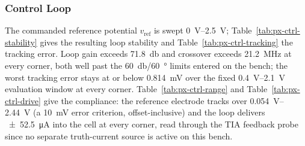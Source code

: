%

\subsubsection{Control Loop}\label{sss:pixel-ctrl}

The commanded reference potential $v_{\mathrm{ref}}$ is swept
\SIrange{0}{2.5}{\volt}; Table~\ref{tab:px-ctrl-stability} gives the resulting
loop stability and Table~\ref{tab:px-ctrl-tracking} the tracking error. Loop
gain exceeds \SI{71.8}{\decibel} and crossover exceeds \SI{21.2}{\mega\hertz}
at every corner, both well past the \SI{60}{\decibel}/\SI{60}{\degree} limits
entered on the bench; the worst tracking error stays at or below
\SI{0.814}{\milli\volt} over the fixed \SIrange{0.4}{2.1}{\volt} evaluation
window at every corner. Table~\ref{tab:px-ctrl-range} and
Table~\ref{tab:px-ctrl-drive} give the compliance: the reference electrode
tracks over \SIrange{0.054}{2.44}{\volt} (a \SI{10}{\milli\volt} error
criterion, offset-inclusive) and the loop delivers \SI{\pm 52.5}{\micro\ampere}
into the cell at every corner, read through the TIA feedback probe since no
separate truth-current source is active on this bench.

